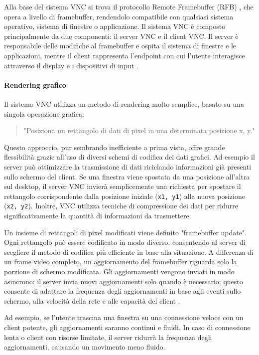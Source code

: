 \documentclass[12pt,a4paper,openright,twoside]{book}
\begin{document}
Alla base del sistema VNC si trova il protocollo Remote Framebuffer (RFB) \cite{wikipediaVNC}, che opera a livello di framebuffer, rendendolo compatibile con qualsiasi sistema operativo, sistema di finestre o applicazione. Il sistema VNC è composto principalmente da due componenti: il server VNC e il client VNC. Il server è responsabile delle modifiche al framebuffer e ospita il sistema di finestre e le applicazioni, mentre il client rappresenta l'endpoint con cui l'utente interagisce attraverso il display e i dispositivi di input \cite{richardson1998vnc}.

\paragraph{Rendering grafico}

Il sistema VNC utilizza un metodo di rendering molto semplice, basato su una singola operazione grafica:
\begin{quote}
    "Posiziona un rettangolo di dati di pixel in una determinata posizione x, y."
\end{quote}
Questo approccio, pur sembrando inefficiente a prima vista, offre grande flessibilità grazie all'uso di diversi schemi di codifica dei dati grafici.
Ad esempio il server può ottimizzare la trasmissione di dati riciclando informazioni già presenti sullo schermo del client. Se una finestra viene spostata da una posizione all'altra sul desktop, il server VNC invierà semplicemente una richiesta per spostare il rettangolo corrispondente dalla posizione iniziale (\texttt{x1, y1}) alla nuova posizione (\texttt{x2, y2}). Inoltre, VNC utilizza tecniche di compressione dei dati per ridurre significativamente la quantità di informazioni da trasmettere.

Un insieme di rettangoli di pixel modificati viene definito "framebuffer update". Ogni rettangolo può essere codificato in modo diverso, consentendo al server di scegliere il metodo di codifica più efficiente in base alla situazione. A differenza di un frame video completo, un aggiornamento del framebuffer riguarda solo la porzione di schermo modificata. Gli aggiornamenti vengono inviati in modo asincrono: il server invia nuovi aggiornamenti solo quando è necessario; questo consente di adattare la frequenza degli aggiornamenti in base agli eventi sullo schermo, alla velocità della rete e alle capacità del client \cite{richardson1998vnc}.

Ad esempio, se l'utente trascina una finestra su una connessione veloce con un client potente, gli aggiornamenti saranno continui e fluidi. In caso di connessione lenta o client con risorse limitate, il server ridurrà la frequenza degli aggiornamenti, causando un movimento meno fluido.
\end{document}
